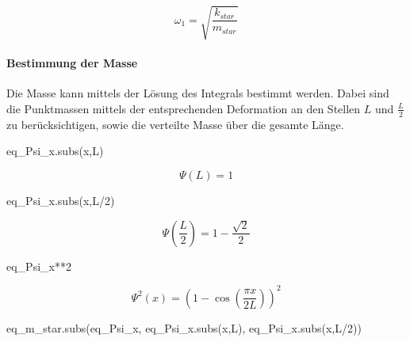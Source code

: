 \documentclass[
  letterpaper,
  DIV=11,
  numbers=noendperiod]{scrartcl}
\let\oldparagraph\paragraph
\renewcommand{\paragraph}[1]{\oldparagraph{#1}\mbox{}}
\newenvironment{Shaded}{\begin{snugshade}}{\end{snugshade}}
\newcommand{\DecValTok}[1]{\textcolor[rgb]{0.68,0.00,0.00}{#1}}
\newcommand{\NormalTok}[1]{\textcolor[rgb]{0.00,0.23,0.31}{#1}}
\newcommand{\OperatorTok}[1]{\textcolor[rgb]{0.37,0.37,0.37}{#1}}
\begin{document}
\begin{equation}\omega_{1} = \sqrt{\frac{k_{star}}{m_{star}}}\end{equation}

\hypertarget{bestimmung-der-masse}{%
\paragraph{Bestimmung der Masse}\label{bestimmung-der-masse}}

Die Masse kann mittels der Lösung des Integrals bestimmt werden. Dabei
sind die Punktmassen mittels der entsprechenden Deformation an den
Stellen \(L\) und \(\frac{L}{2}\) zu berücksichtigen, sowie die
verteilte Masse über die gesamte Länge.

\begin{Shaded}
\begin{Highlighting}[]
\NormalTok{eq\_Psi\_x.subs(x,L)}
\end{Highlighting}
\end{Shaded}

\begin{equation}\Psi{\left(L \right)} = 1\end{equation}

\begin{Shaded}
\begin{Highlighting}[]
\NormalTok{eq\_Psi\_x.subs(x,L}\OperatorTok{/}\DecValTok{2}\NormalTok{)}
\end{Highlighting}
\end{Shaded}

\begin{equation}\Psi{\left(\frac{L}{2} \right)} = 1 - \frac{\sqrt{2}}{2}\end{equation}

\begin{Shaded}
\begin{Highlighting}[]
\NormalTok{eq\_Psi\_x}\OperatorTok{**}\DecValTok{2}
\end{Highlighting}
\end{Shaded}

\begin{equation}\Psi^{2}{\left(x \right)} = \left(1 - \cos{\left(\frac{\pi x}{2 L} \right)}\right)^{2}\end{equation}

\begin{Shaded}
\begin{Highlighting}[]
\NormalTok{eq\_m\_star.subs(eq\_Psi\_x, eq\_Psi\_x.subs(x,L), eq\_Psi\_x.subs(x,L}\OperatorTok{/}\DecValTok{2}\NormalTok{))}
\end{Highlighting}
\end{Shaded}
\end{document}
